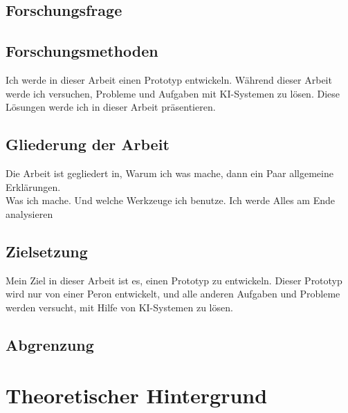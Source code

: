 \documentclass[12pt,a4paper,bibliography=totocnumbered,listof=totocnumbered]{scrartcl}
\begin{document}
\subsection{Forschungsfrage}
\subsection{Forschungsmethoden}
Ich werde in dieser Arbeit einen Prototyp entwickeln. Während dieser Arbeit werde ich versuchen, Probleme und Aufgaben mit KI-Systemen zu lösen. Diese Lösungen werde ich in dieser Arbeit präsentieren.
\subsection{Gliederung der Arbeit}%
Die Arbeit ist gegliedert in, Warum ich was mache, dann ein Paar allgemeine Erklärungen.
\\
Was ich mache. Und welche Werkzeuge ich benutze. Ich werde Alles am Ende analysieren

\subsection{Zielsetzung}
Mein Ziel in dieser Arbeit ist es, einen Prototyp zu entwickeln. Dieser Prototyp wird nur von einer Peron entwickelt, und alle anderen Aufgaben und Probleme werden versucht, mit Hilfe von KI-Systemen zu lösen.
\subsection{Abgrenzung}

\section{Theoretischer Hintergrund}

\end{document}
